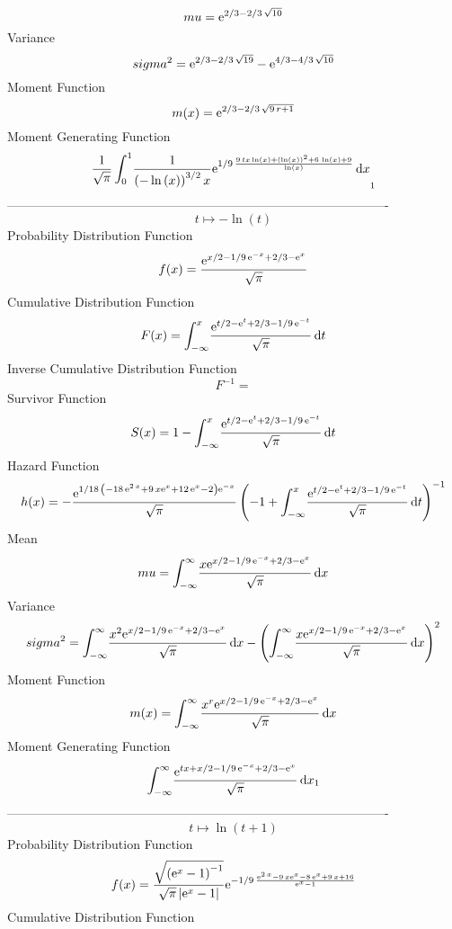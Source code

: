 \documentclass[12pt]{article}
\begin{document}
 $$ mu={{\rm e}^{2/3-2/3\,\sqrt {10}}}
$$ Variance 
 $$ sigma^2 = {{\rm e}^{2/3-2/3\,\sqrt {19}}}-{{\rm e}^{4/3-4/3\,\sqrt {10}}}
$$Moment Function 
 $$ m(x) = {{\rm e}^{2/3-2/3\,\sqrt {9\,r+1}}}
$$ Moment Generating Function 
 $${\frac {1}{\sqrt {\pi}}\int_{0}^{1}\!{\frac {1}{ \left( -\ln  \left( x
 \right)  \right) ^{3/2}x}{{\rm e}^{1/9\,{\frac {9\,tx\ln  \left( x
 \right) + \left( \ln  \left( x \right)  \right) ^{2}+6\,\ln  \left( x
 \right) +9}{\ln  \left( x \right) }}}}}\,{\rm d}x}_{{1}}
$$-------------------------------------------------------------------------------------------  \\$$t\mapsto -\ln  \left( t \right) 
$$Probability Distribution Function 
$$  f(x)={\frac {{{\rm e}^{x/2-1/9\,{{\rm e}^{-x}}+2/3-{{\rm e}^{x}}}}}{\sqrt {
\pi}}}
$$Cumulative Distribution Function  
 $$F(x)=\int_{-\infty }^{x}\!{\frac {{{\rm e}^{t/2-{{\rm e}^{t}}+2/3-1/9\,{
{\rm e}^{-t}}}}}{\sqrt {\pi}}}\,{\rm d}t
$$ Inverse Cumulative Distribution Function 
  $$F^{-1} = $$Survivor Function 
 $$ S(x)=1-\int_{-\infty }^{x}\!{\frac {{{\rm e}^{t/2-{{\rm e}^{t}}+2/3-1/9\,{
{\rm e}^{-t}}}}}{\sqrt {\pi}}}\,{\rm d}t
$$ Hazard Function 
 $$ h(x)=-{\frac {{{\rm e}^{1/18\, \left( -18\,{{\rm e}^{2\,x}}+9\,x{{\rm e}^{x
}}+12\,{{\rm e}^{x}}-2 \right) {{\rm e}^{-x}}}}}{\sqrt {\pi}} \left( -
1+\int_{-\infty }^{x}\!{\frac {{{\rm e}^{t/2-{{\rm e}^{t}}+2/3-1/9\,{
{\rm e}^{-t}}}}}{\sqrt {\pi}}}\,{\rm d}t \right) ^{-1}}
$$Mean 
 $$ mu=\int_{-\infty }^{\infty }\!{\frac {x{{\rm e}^{x/2-1/9\,{{\rm e}^{-x}}+
2/3-{{\rm e}^{x}}}}}{\sqrt {\pi}}}\,{\rm d}x
$$ Variance 
 $$ sigma^2 = \int_{-\infty }^{\infty }\!{\frac {{x}^{2}{{\rm e}^{x/2-1/9\,{{\rm e}^
{-x}}+2/3-{{\rm e}^{x}}}}}{\sqrt {\pi}}}\,{\rm d}x- \left( \int_{-
\infty }^{\infty }\!{\frac {x{{\rm e}^{x/2-1/9\,{{\rm e}^{-x}}+2/3-{
{\rm e}^{x}}}}}{\sqrt {\pi}}}\,{\rm d}x \right) ^{2}
$$Moment Function 
 $$ m(x) = \int_{-\infty }^{\infty }\!{\frac {{x}^{r}{{\rm e}^{x/2-1/9\,{{\rm e}^
{-x}}+2/3-{{\rm e}^{x}}}}}{\sqrt {\pi}}}\,{\rm d}x
$$ Moment Generating Function 
 $$\int_{-\infty }^{\infty }\!{\frac {{{\rm e}^{tx+x/2-1/9\,{{\rm e}^{-x}
}+2/3-{{\rm e}^{x}}}}}{\sqrt {\pi}}}\,{\rm d}x_{{1}}
$$-------------------------------------------------------------------------------------------  \\$$t\mapsto \ln  \left( t+1 \right) 
$$Probability Distribution Function 
$$  f(x)={\frac {\sqrt { \left( {{\rm e}^{x}}-1 \right) ^{-1}}}{\sqrt {\pi}
 \left| {{\rm e}^{x}}-1 \right| }{{\rm e}^{-1/9\,{\frac {{{\rm e}^{2\,
x}}-9\,x{{\rm e}^{x}}-8\,{{\rm e}^{x}}+9\,x+16}{{{\rm e}^{x}}-1}}}}}
$$Cumulative Distribution Function  
\end{document}
